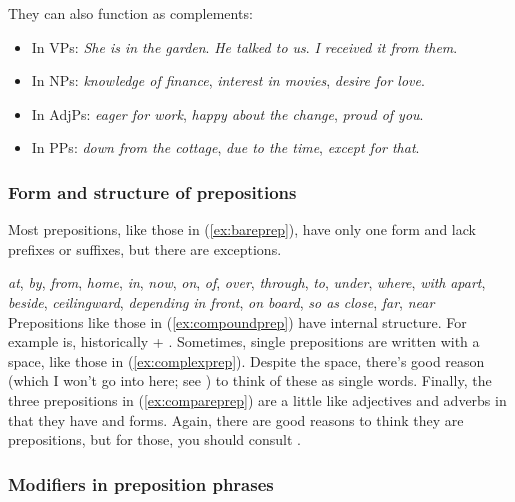 They can also function as complements:

\begin{itemize}[noitemsep]
   \item In VPs: \textit{She is \emph{in the garden}}. \textit{He talked \emph{to us}}. \textit{I received it \emph{from them}}.
   \item In NPs: \textit{knowledge \emph{of finance}}, \textit{interest \emph{in movies}}, \textit{desire \emph{for love}}.
   \item In AdjPs: \textit{eager \emph{for work}}, \textit{happy \emph{about the change}}, \textit{proud \emph{of you}}.
   \item In PPs: \textit{down \emph{from the cottage}}, \textit{due \emph{to the time}}, \textit{except \emph{for that}}.
\end{itemize}

\subsubsection*{Form and structure of prepositions}

Most prepositions, like those in (\ref{ex:bareprep}), have only one form and lack prefixes or suffixes, but there are exceptions.

\ea 
   \ea \emph{at}, \emph{by}, \emph{from}, \emph{home}, \emph{in}, \emph{now}, \emph{on}, \emph{of}, \emph{over}, \emph{through}, \emph{to}, \emph{under}, \emph{where}, \emph{with} \label{ex:bareprep}
   \ex \emph{apart}, \emph{beside}, \emph{ceilingward}, \emph{depending} \label{ex:compoundprep}
   \ex \emph{in front}, \emph{on board}, \emph{so as} \label{ex:complexprep}
   \ex \emph{close}, \emph{far}, \emph{near} \label{ex:compareprep}
   \z
\z
\noindent Prepositions like those in (\ref{ex:compoundprep}) have internal structure. For example  is, historically  + . Sometimes, single prepositions are written with a space, like those in (\ref{ex:complexprep}). Despite the space, there's good reason (which I won't go into here; see \cite[622]{Huddleston2002}) to think of these as single words. Finally, the three prepositions in (\ref{ex:compareprep}) are a little like adjectives and adverbs in that they have  and  forms. Again, there are good reasons to think they are prepositions, but for those, you should consult \textcite[609]{Huddleston2002}.

\subsubsection*{Modifiers in preposition phrases}

